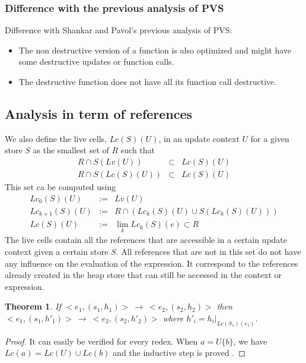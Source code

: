 \documentclass[12pt,a4paper]{article}
\newtheorem{theorem}{Theorem}
\newcommand{\ucont}[1]{\{#1\}}
\begin{document}
\subsubsection{Difference with the previous analysis of PVS}

Difference with Shankar \cite{shankar02} and Pavol's \cite{pavol} previous analysis of PVS:
\begin{itemize}
\item The non destructive version of a function is also optimized and might have some destructive updates or function calls.
\item The destructive function does not have all its function call destructive.
\end{itemize}





\subsection{Analysis in term of references}

We also define the live cells, $Lc(S)(U)$, in an update context $U$ for a given store $S$ as the smallest set of $R$ such that
\begin{eqnarray*}
R \cap S(Lv(U)) &\subset & Lc(S)(U) \\
R \cap S(Lc(S)(U)) &\subset & Lc(S)(U)
\end{eqnarray*}
This set ca be computed using
\begin{eqnarray*}
Lc_0(S)(U) &:=& Lv(U) \\
Lc_{k+1}(S)(U) &:=& R \cap (Lc_k(S)(U) \cup S( Lc_k(S)(U) ) ) \\
Lc(S)(U) &:=& \lim_k Lc_k(S)(e) \subset R
\end{eqnarray*}
The live cells contain all the references that are accessible in a certain update context given a certain store $S$. All references that are not in this set do not have any influence on the evaluation of the expression.
It correspond to the references already created in the heap store that can still be accessed in the context or expression.

\begin{theorem}
If $<e_1, (s_1, h_1)> \ \longrightarrow \ <e_2, (s_2, h_2)>$ then $<e_1, (s_1, h'_1)> \ \longrightarrow \ <e_2, (s_2, h'_2)>$ where $h'_i = h_i|_{Lc(S_1)(e_1)}$.
\end{theorem}
\begin{proof}
It can easily be verified for every redex. When $a = U\ucont{b}$, we have $Lc(a) = Lc(U) \cup Lc(b)$ and the inductive step is proved .
\end{proof}
\end{document}
